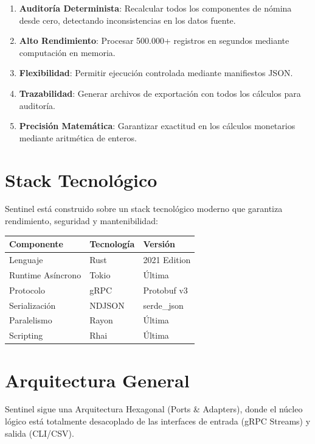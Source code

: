 \begin{enumerate}
    \item \textbf{Auditoría Determinista}: Recalcular todos los componentes de nómina desde cero, detectando inconsistencias en los datos fuente.
    \item \textbf{Alto Rendimiento}: Procesar 500.000+ registros en segundos mediante computación en memoria.
    \item \textbf{Flexibilidad}: Permitir ejecución controlada mediante manifiestos JSON.
    \item \textbf{Trazabilidad}: Generar archivos de exportación con todos los cálculos para auditoría.
    \item \textbf{Precisión Matemática}: Garantizar exactitud en los cálculos monetarios mediante aritmética de enteros.
\end{enumerate}

\bigskip

\section{Stack Tecnológico}

Sentinel está construido sobre un stack tecnológico moderno que garantiza rendimiento, seguridad y mantenibilidad:

\bigskip

\begin{center}
\begin{tabular}{lll}
\toprule
\textbf{Componente} & \textbf{Tecnología} & \textbf{Versión} \\
\midrule
Lenguaje & Rust & 2021 Edition \\
Runtime Asíncrono & Tokio & Última \\
Protocolo & gRPC & Protobuf v3 \\
Serialización & NDJSON & serde\_json \\
Paralelismo & Rayon & Última \\
Scripting & Rhai & Última \\
\bottomrule
\end{tabular}
\end{center}

\bigskip

\section{Arquitectura General}

Sentinel sigue una Arquitectura Hexagonal (Ports \& Adapters), donde el núcleo lógico está totalmente desacoplado de las interfaces de entrada (gRPC Streams) y salida (CLI/CSV).

